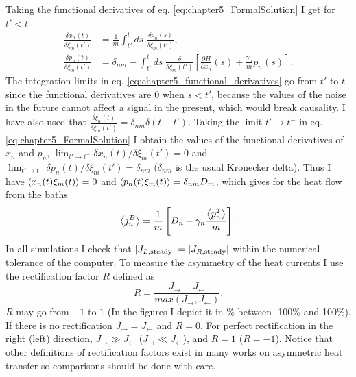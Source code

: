 %
Taking the functional derivatives of eq. \eqref{eq:chapter5_FormalSolution} I get for $t'<t$
%
\begin{equation}
  \begin{split}
    \frac{\delta x_n(t)}{\delta \xi_m(t')} &= \frac{1}{m}\int_{t'}^{t} ds\; \frac{\delta p_n(s)}{\delta \xi_m(t')},
    \\
    \frac{\delta p_n(t)}{\delta \xi_m(t')} &= \delta_{nm} -\int_{t'}^{t} ds\;\frac{\delta}{\delta \xi_m(t')}\left[\frac{\partial H}{\partial x_n}(s) + \frac{\gamma_n}{m}p_n(s) \right].
  \end{split}
  \label{eq:chapter5_functional_derivatives}
\end{equation}
%
The integration limits in eq. \eqref{eq:chapter5_functional_derivatives} go from $t'$ to $t$ since the functional derivatives are $0$ when $s<t'$, because the values of the noise in the future cannot affect a signal in the present, which would break causality. I have also used that $\frac{\delta \xi_n(t)}{\delta \xi_m(t')} = \delta_{nm}\delta(t-t')$. Taking the limit $t'\to t^-$ in eq. \eqref{eq:chapter5_FormalSolution} I obtain the values of the functional derivatives of $x_n$ and $p_n$, $ \lim_{t'\to t^-} \delta x_n(t)/\delta \xi_m(t') = 0$ and $\lim_{t'\to t^-} \delta p_n(t)/\delta \xi_m(t') = \delta_{nm}$ ($\delta_{nm}$ is the usual Kronecker delta). Thus I have $\expval{x_n(t) \xi_m(t)} = 0$ and $\expval{p_n(t) \xi_m(t)} = \delta_{nm}D_m$, which gives for the heat flow from the baths
%
\begin{equation}
    \expval{j^B_n} = \frac{1}{m} \left[ D_n-\gamma_n \frac{\expval{p_n^2}}{m} \right].
    \label{eq:chapter5_BathHeatFlowNovikov}
\end{equation}
%
In all simulations I check that $|J_{L,{\rm steady}}|=|J_{R,{\rm steady}}|$ within the numerical tolerance of the computer. To measure the asymmetry of the heat currents I use the rectification factor $R$ defined as
%
\begin{equation}
    R = \frac{ J_\rightarrow - J_\leftarrow}{max(J_\rightarrow,J_\leftarrow)}.
    \label{eq:chapter5_R_Factor}
\end{equation}
%
$R$ may go from $-1$ to $1$ (In the figures I depict it in \% between -100\% and 100\%). If there is no rectification $J_\rightarrow = J_\leftarrow $ and $R=0$. For perfect rectification in the right (left) direction, $J_\rightarrow \gg J_\leftarrow$ ($J_\rightarrow \ll J_\leftarrow$), and $R = 1$ ($R = -1$).
Notice that other  definitions of rectification factors exist in many works
on asymmetric heat transfer so comparisons should be done with care.
%

